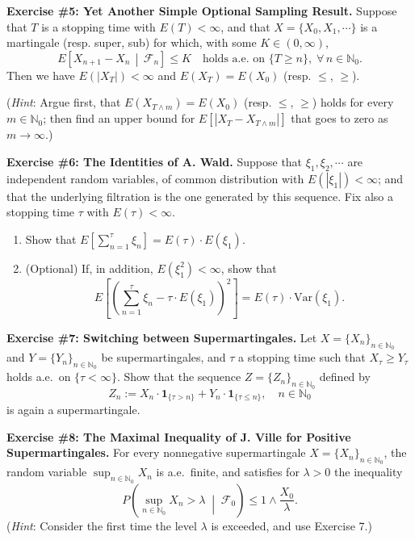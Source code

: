 \documentclass[12pt]{article}
\begin{document}
\bigskip

\noindent\textbf{Exercise \#5: Yet Another Simple Optional Sampling Result.} Suppose that $T$ is a stopping time with $E(T) < \infty$, and that $X = \{X_0, X_1, \cdots\}$ is a martingale (resp. super, sub) for which, with some $K \in (0, \infty)$,
\[
    E\left[X_{n+1} - X_n \,\middle|\, \mathcal{F}_n\right] \leq K \quad \text{holds a.e. on } \{T \geq n\}, \; \forall\, n \in \mathbb{N}_0.
\]
Then we have $E(|X_T|) < \infty$ and $E(X_T) = E(X_0)$ (resp. $\leq$, $\geq$).

\smallskip
\noindent(\textit{Hint}: Argue first, that $E(X_{T \wedge m}) = E(X_0)$ (resp. $\leq$, $\geq$) holds for every $m \in \mathbb{N}_0$; then find an upper bound for $E\left[|X_T - X_{T \wedge m}|\right]$ that goes to zero as $m \to \infty$.)

\bigskip

\noindent\textbf{Exercise \#6: The Identities of A. Wald.} Suppose that $\xi_1, \xi_2, \cdots$ are independent random variables, of common distribution with $E(|\xi_1|) < \infty$; and that the underlying filtration is the one generated by this sequence. Fix also a stopping time $\tau$ with $E(\tau) < \infty$.
\begin{enumerate}
    \item[(i)] Show that $E\left[\sum_{n=1}^{\tau} \xi_n\right] = E(\tau) \cdot E(\xi_1)$.
    \item[(ii)$^*$] (Optional) If, in addition, $E(\xi_1^2) < \infty$, show that
    \[
        E\left[\left(\sum_{n=1}^{\tau} \xi_n - \tau \cdot E(\xi_1)\right)^2\right] = E(\tau) \cdot \mathrm{Var}(\xi_1).
    \]
\end{enumerate}

\bigskip

\noindent\textbf{Exercise \#7: Switching between Supermartingales.} Let $X = \{X_n\}_{n \in \mathbb{N}_0}$ and $Y = \{Y_n\}_{n \in \mathbb{N}_0}$ be supermartingales, and $\tau$ a stopping time such that $X_\tau \geq Y_\tau$ holds a.e.\ on $\{\tau < \infty\}$. Show that the sequence $Z = \{Z_n\}_{n \in \mathbb{N}_0}$ defined by
\[
    Z_n := X_n \cdot \mathbf{1}_{\{\tau > n\}} + Y_n \cdot \mathbf{1}_{\{\tau \leq n\}}, \quad n \in \mathbb{N}_0
\]
is again a supermartingale.

\bigskip

\noindent\textbf{Exercise \#8: The Maximal Inequality of J. Ville for Positive Supermartingales.} For every nonnegative supermartingale $X = \{X_n\}_{n \in \mathbb{N}_0}$, the random variable $\sup_{n \in \mathbb{N}_0} X_n$ is a.e.\ finite, and satisfies for $\lambda > 0$ the inequality
\[
    P\left(\sup_{n \in \mathbb{N}_0} X_n > \lambda \;\middle|\; \mathcal{F}_0\right) \leq 1 \wedge \frac{X_0}{\lambda}.
\]
(\textit{Hint}: Consider the first time the level $\lambda$ is exceeded, and use Exercise 7.)
\end{document}
